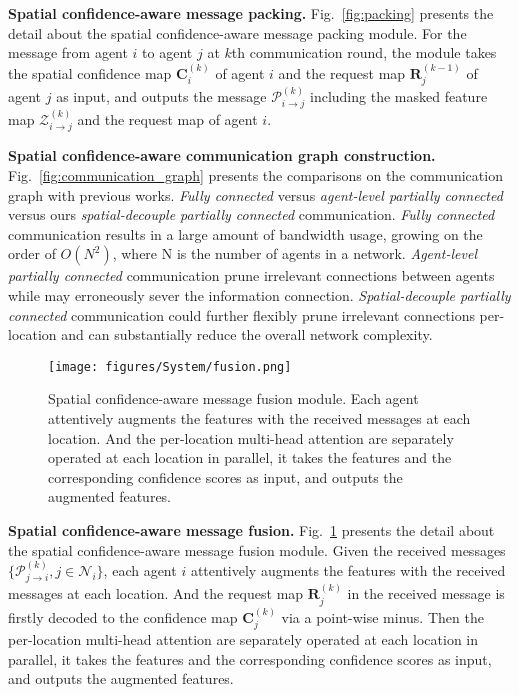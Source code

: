 \documentclass{article}
\begin{document}
\textbf{Spatial confidence-aware message packing.} Fig.~\ref{fig:packing} presents the detail about the spatial confidence-aware message packing module. For the message from agent $i$ to agent $j$ at $k$th communication round, the module takes the spatial confidence map $\mathbf{C}_{i}^{(k)}$ of agent $i$ and the request map $\mathbf{R}_{j}^{(k-1)}$ of agent $j$ as input, and outputs the message $\mathcal{P}_{i\rightarrow j}^{(k)}$ including the masked feature map $\mathcal{Z}_{i\rightarrow j}^{(k)}$ and the request map of agent $i$.




\textbf{Spatial confidence-aware communication graph construction.} Fig.~\ref{fig:communication_graph} presents the comparisons on the communication graph with previous works. \textit{Fully connected} versus \textit{agent-level partially connected} versus ours \textit{spatial-decouple partially connected} communication. \textit{Fully connected} communication results in a large amount of bandwidth usage, growing on the order of $O(N^2)$, where N is the number of agents in a network. \textit{Agent-level partially connected} communication prune irrelevant connections between agents while may erroneously sever the information connection. \textit{Spatial-decouple partially connected} communication could further flexibly prune irrelevant connections per-location and can substantially reduce the overall network complexity.



\begin{figure}
    \centering
\texttt{[image: figures/System/fusion.png]}
    \caption{Spatial confidence-aware message fusion module. Each agent attentively augments the features with the received messages at each location. And the per-location multi-head attention are separately operated at each location in parallel, it takes the features and the corresponding confidence scores as input, and outputs the augmented features.}
    \label{fig:fusion}
\end{figure}

\textbf{Spatial confidence-aware message fusion.} Fig.~\ref{fig:fusion} presents the detail about the spatial confidence-aware message fusion module. Given the received messages $\{\mathcal{P}_{j\rightarrow i}^{(k)}, j\in \mathcal{N}_i\}$, each agent $i$ attentively augments the features with the received messages at each location. And the request map $\mathbf{R}_{j}^{(k)}$ in the received message is firstly decoded to the confidence map $\mathbf{C}_{j}^{(k)}$ via a point-wise minus. Then the per-location multi-head attention are separately operated at each location in parallel, it takes the features and the corresponding confidence scores as input, and outputs the augmented features. 
\end{document}
